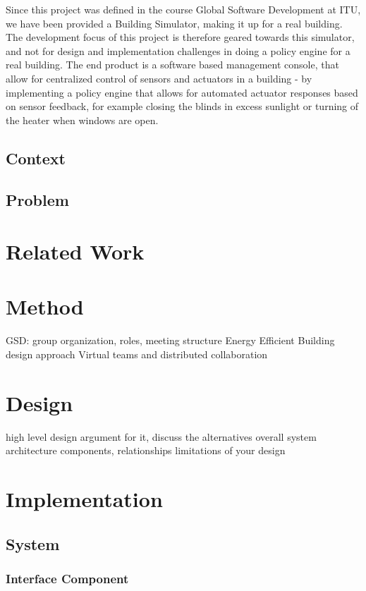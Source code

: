 \documentclass[11pt]{report}
\begin{document}
Since this project was defined in the course Global Software Development at ITU, we have been provided a Building Simulator, making it up for a real building. The development focus of this project is therefore geared towards this simulator, and not for design and implementation challenges in doing a policy engine for a real building. The end product is a software based management console, that allow for centralized control of sensors and actuators in a building - by implementing a policy engine that allows for automated actuator responses based on sensor feedback, for example closing the blinds in excess sunlight or turning of the heater when windows are open.
\section{Context}

\section{Problem}

\chapter{Related Work}

\chapter{Method}

GSD: group organization, roles, meeting structure
Energy Efficient Building design approach
Virtual teams and distributed collaboration

\chapter{Design}

high level design
argument for it, discuss the alternatives
overall system architecture
components, relationships
limitations of your design

\chapter{Implementation}

\section{System}

\subsection{Interface Component}
\end{document}
